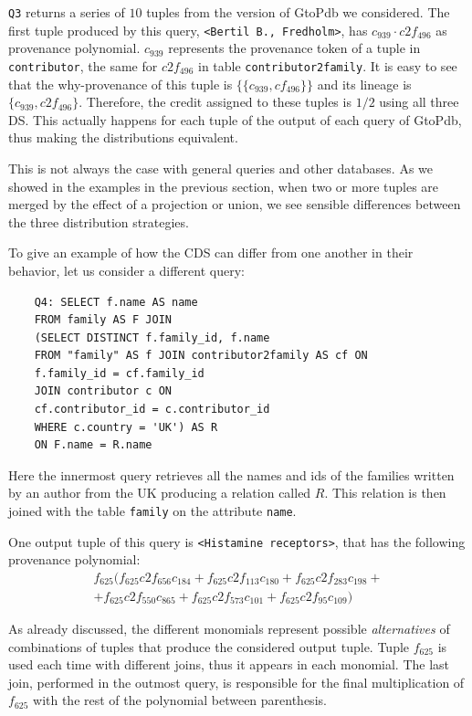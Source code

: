 \texttt{Q3} returns a series of $10$ tuples from the version of GtoPdb we considered. 
The first tuple produced by this query, \texttt{<Bertil B., Fredholm>}, has $c_{939} \cdot c2f_{496}$ as provenance polynomial.
$c_{939}$ represents the provenance token of a tuple in \texttt{contributor}, the same for $c2f_{496}$ in table \texttt{contributor2family}. 
It is easy to see that the why-provenance of this tuple is $\{\{c_{939}, cf_{496} \}\}$ and its lineage is $\{c_{939}, c2f_{496} \}$.
Therefore, the credit assigned to these tuples is $1/2$ using all three DS.
This actually happens for each tuple of the output of each query of GtoPdb, thus making the distributions equivalent.

This is not always the case with general queries and other databases. As we showed in the examples in the previous section, when two or more tuples are merged by the effect of a projection or union, we see sensible differences between the three distribution strategies. %

To give an example of how the CDS can differ from one another in their behavior, let us consider a different query:
\begin{verbatim}
	Q4: SELECT f.name AS name
	FROM family AS F JOIN
	(SELECT DISTINCT f.family_id, f.name
	FROM "family" AS f JOIN contributor2family AS cf ON 
	f.family_id = cf.family_id 
	JOIN contributor c ON 
	cf.contributor_id = c.contributor_id 
	WHERE c.country = 'UK') AS R 
	ON F.name = R.name
\end{verbatim}

Here the innermost query retrieves all the names and ids of the families written by an author from the UK producing a relation called $R$. This relation is then joined with the table \texttt{family} on the attribute \texttt{name}. 

One output tuple of this query is \texttt{<Histamine receptors>}, that has the following provenance polynomial:
\[
\begin{array}{c}
	f_{625}(f_{625} c2f_{656} c_{184} + f_{625} c2f_{113} c_{180} + f_{625} c2f_{283} c_{198} +\\ 
	+ f_{625} c2f_{550} c_{865} + f_{625} c2f_{573} c_{101} + f_{625} c2f_{95} c_{109} )
\end{array}
\]

As already discussed, the different monomials represent possible \emph{alternatives} of combinations of tuples that produce the considered output tuple. 
Tuple $f_{625}$ is used each time with different joins, thus it appears in each monomial. 
The last join, performed in the outmost query, is responsible for the final multiplication of $f_{625}$ with the rest of the polynomial between parenthesis.

